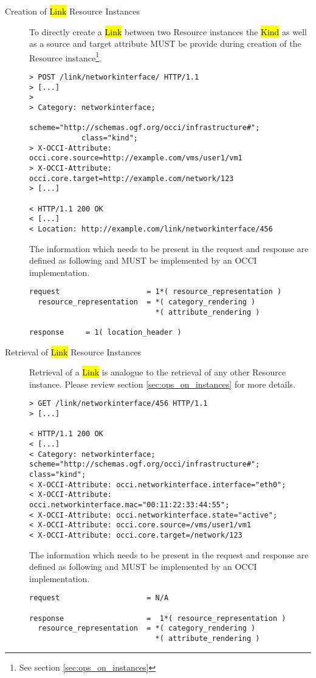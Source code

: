 \documentclass[10pt,a4paper]{article}
\begin{document}
\begin{description}
  \item[Creation of \hl{Link} Resource Instances] To directly create a
    \hl{Link} between two Resource instances the \hl{Kind} as well as a
    source and target attribute MUST be provide during creation of the
    Resource instance\footnote{See section \ref{sec:ops_on_instances}}.

\begin{verbatim}
> POST /link/networkinterface/ HTTP/1.1
> [...]
> 
> Category: networkinterface; 
            scheme="http://schemas.ogf.org/occi/infrastructure#"; 
            class="kind"; 
> X-OCCI-Attribute: occi.core.source=http://example.com/vms/user1/vm1
> X-OCCI-Attribute: occi.core.target=http://example.com/network/123
> [...]
 
< HTTP/1.1 200 OK
< [...]
< Location: http://example.com/link/networkinterface/456
\end{verbatim}

    The information which needs to be present in the request and
    response are defined as following and MUST be implemented by an
    OCCI implementation.

\begin{verbatim}
request                    = 1*( resource_representation )
  resource_representation  = *( category_rendering )
                             *( attribute_rendering )

response     = 1( location_header )
\end{verbatim}

  \item[Retrieval of \hl{Link} Resource Instances] Retrieval of a
    \hl{Link} is analogue to the retrieval of any other Resource
    instance. Please review section \ref{sec:ops_on_instances} for
    more details.

\begin{verbatim}
> GET /link/networkinterface/456 HTTP/1.1
> [...]

< HTTP/1.1 200 OK
< [...]
< Category: networkinterface; scheme="http://schemas.ogf.org/occi/infrastructure#"; class="kind";
< X-OCCI-Attribute: occi.networkinterface.interface="eth0";
< X-OCCI-Attribute: occi.networkinterface.mac="00:11:22:33:44:55";
< X-OCCI-Attribute: occi.networkinterface.state="active";
< X-OCCI-Attribute: occi.core.source=/vms/user1/vm1
< X-OCCI-Attribute: occi.core.target=/network/123
\end{verbatim}

    The information which needs to be present in the request and
    response are defined as following and MUST be implemented by an
    OCCI implementation.

\begin{verbatim}
request                    = N/A

response                   =  1*( resource_representation )
  resource_representation  = *( category_rendering )
                             *( attribute_rendering )
\end{verbatim}

\end{description}
\end{document}
